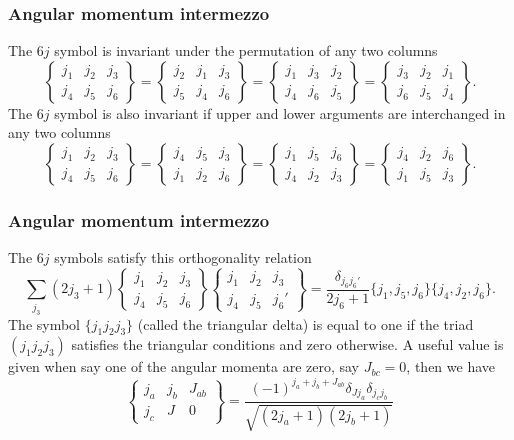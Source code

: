 \documentclass[compress]{beamer}
\begin{document}
\frame
{
\frametitle{Angular momentum intermezzo}
\begin{small}
{\scriptsize
The $6j$ symbol is invariant under the permutation of any two columns
\[
    \begin{Bmatrix} j_1 & j_2 & j_3\\ j_4 & j_5 & j_6 \end{Bmatrix} = \begin{Bmatrix} j_2 & j_1 & j_3\\ j_5 & j_4 & j_6 \end{Bmatrix} = \begin{Bmatrix} j_1 & j_3 & j_2\\ j_4 & j_6 & j_5 \end{Bmatrix} = \begin{Bmatrix} j_3 & j_2 & j_1\\ j_6 & j_5 & j_4 \end{Bmatrix}. 
\]
The $6j$ symbol is also invariant if upper and lower arguments are interchanged in any two columns
\[
    \begin{Bmatrix} j_1 & j_2 & j_3\\ j_4 & j_5 & j_6 \end{Bmatrix} = \begin{Bmatrix} j_4 & j_5 & j_3\\ j_1 & j_2 & j_6 \end{Bmatrix} = \begin{Bmatrix} j_1 & j_5 & j_6\\ j_4 & j_2 & j_3 \end{Bmatrix} = \begin{Bmatrix} j_4 & j_2 & j_6\\ j_1 & j_5 & j_3 \end{Bmatrix}. 
\]
}
\end{small}
}

\frame
{
\frametitle{Angular momentum intermezzo}
\begin{small}
{\scriptsize
The $6j$ symbols satisfy this orthogonality relation
\[
    \sum_{j_3} (2j_3+1) \begin{Bmatrix} j_1 & j_2 & j_3\\ j_4 & j_5 & j_6 \end{Bmatrix} \begin{Bmatrix} j_1 & j_2 & j_3\\ j_4 & j_5 & j_6' \end{Bmatrix} = \frac{\delta_{j_6^{}j_6'}}{2j_6+1} \{j_1,j_5,j_6\} \{j_4,j_2,j_6\}. 
\]
The symbol $\{j_1j_2j_3\}$ (called the triangular delta) is equal to one if the triad $(j_1j_2j_3)$ satisfies the triangular conditions and zero otherwise.
A useful value is given when say one of the angular momenta are zero, say $J_{bc}=0$, then we have
\[
\left\{\begin{array}{ccc} j_a & j_b& J_{ab} \\ j_c & J & 0 \end{array}\right\}=\frac{(-1)^{j_a+j_b+J_{ab}}\delta_{Jj_a}\delta_{j_cj_b} }{\sqrt{(2j_{a}+1)(2j_{b}+1)}}
\]
}
\end{small}
}
\end{document}
